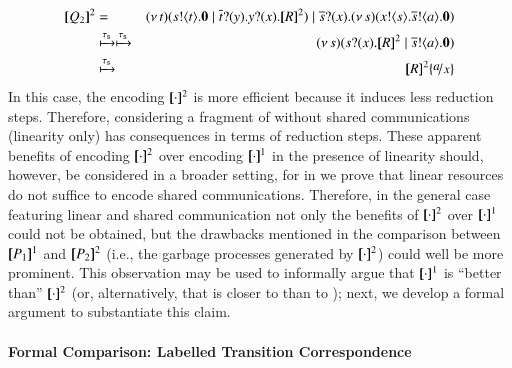 \documentclass[preprint,11pt]{elsarticle}
\begin{document}
{\begin{eqnarray*}
	\pmap{Q_2}{2} & = & \newsp{t}{\bout{s}{t} \inact \Par \binp{\dual{t}}{y} \binp{y}{x} \pmap{R}{2}} \Par \binp{\dual{s}}{x} \newsp{s}{\bout{x}{s} \bout{\dual{s}}{a} \inact}
	\\
	& \hby{\stau} \hby{\stau} & 
	\newsp{s}{\binp{s}{x} \pmap{R}{2} \Par \bout{\dual{s}}{a} \inact}
	\\
	& \hby{\stau} &
	\pmap{R}{2}\subst{a}{x}
\end{eqnarray*}
In this case, the encoding $[\!\![\cdot]\!\!]^2$ is more efficient because it induces less reduction steps.
Therefore, considering a fragment of \HOp without shared communications (linearity only)
has consequences in terms of reduction steps. 
These apparent benefits of encoding  $[\!\![\cdot]\!\!]^2$ over 
encoding  $[\!\![\cdot]\!\!]^1$ in the presence of linearity should, however, be considered in a broader setting, for 
in  we prove that linear resources do 
not suffice to encode shared communications.
Therefore, in the general case featuring linear and shared communication not only the benefits of  $[\!\![\cdot]\!\!]^2$ over  $[\!\![\cdot]\!\!]^1$ could not be obtained,
but the drawbacks mentioned in the comparison between $[\!\![P_1]\!\!]^1$ and $[\!\![P_2]\!\!]^2$ (i.e., the garbage processes 
generated by $[\!\![\cdot]\!\!]^2$) 
could well be more prominent. This observation may be used to informally argue that $[\!\![\cdot]\!\!]^1$ is ``better than'' $[\!\![\cdot]\!\!]^2$ (or, alternatively, that \HOp is closer to \HO than to \sessp);
next, we develop a formal argument to substantiate this claim.

\paragraph{Formal Comparison: Labelled Transition Correspondence}

}
\end{document}
